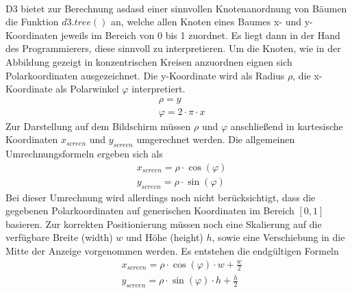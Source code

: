 \\
D3 bietet zur Berechnung asdasd einer sinnvollen Knotenanordnung von Bäumen die Funktion $d3.tree()$ an, welche allen Knoten eines Baumes x- und y-Koordinaten jeweils im Bereich von 0 bis 1 zuordnet. Es liegt dann in der Hand des Programmierers, diese sinnvoll zu interpretieren. Um die Knoten, wie in der Abbildung gezeigt in konzentrischen Kreisen anzuordnen eignen sich Polarkoordinaten ausgezeichnet. Die y-Koordinate wird als Radius $\rho$, die x-Koordinate als Polarwinkel $\varphi$ interpretiert.
\begin{align}
&\rho = y\\
&\varphi = 2 \cdot \pi \cdot x
\end{align}
Zur Darstellung auf dem Bildschirm müssen $\rho$ und $\varphi$ anschließend in kartesische Koordinaten $x_{screen}$ und $y_{screen}$ umgerechnet werden. Die allgemeinen Umrechnungsformeln ergeben sich als
\begin{align}
&x_{screen} = \rho \cdot \cos (\varphi)\\
&y_{screen} = \rho \cdot \sin (\varphi)
\end{align}
Bei dieser Umrechnung wird allerdings noch nicht berücksichtigt, dass die gegebenen Polarkoordinaten auf generischen Koordinaten im Bereich $[0,1]$ basieren. Zur korrekten Positionierung müssen noch eine Skalierung auf die verfügbare Breite (width) $w$ und Höhe (height) $h$, sowie eine Verschiebung in die Mitte der Anzeige vorgenommen werden. Es entstehen die endgültigen Formeln
\begin{align}
&x_{screen} = \rho \cdot \cos (\varphi) \cdot w + \frac{w}{2}\\
&y_{screen} = \rho \cdot \sin (\varphi) \cdot h + \frac{h}{2}
\end{align}